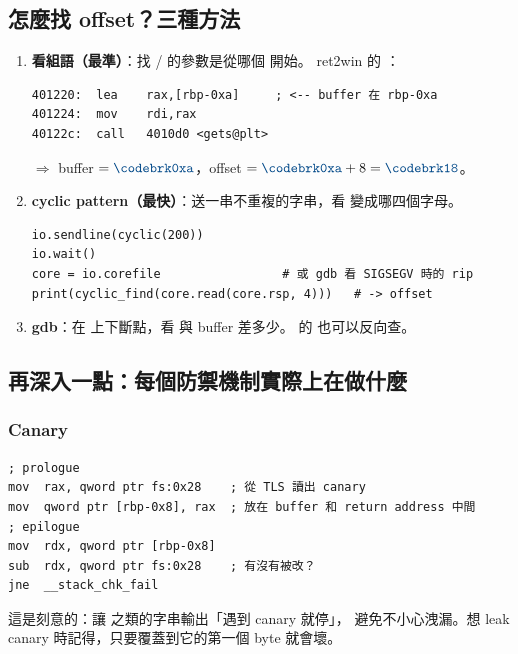 \subsection{怎麼找 offset？三種方法}

\begin{enumerate}[leftmargin=1.5em,itemsep=3pt]
  \item \textbf{看組語（最準）}：找 / 的參數是從哪個  開始。
        ret2win 的 ：
\begin{lstlisting}[style=asm]
401220:  lea    rax,[rbp-0xa]     ; <-- buffer 在 rbp-0xa
401224:  mov    rdi,rax
40122c:  call   4010d0 <gets@plt>
\end{lstlisting}
        $\Rightarrow$ buffer $= \code{0xa}$，offset $= \code{0xa}+8=\code{18}$。

  \item \textbf{cyclic pattern（最快）}：送一串不重複的字串，看  變成哪四個字母。
\begin{lstlisting}[style=py]
io.sendline(cyclic(200))
io.wait()
core = io.corefile                 # 或 gdb 看 SIGSEGV 時的 rip
print(cyclic_find(core.read(core.rsp, 4)))   # -> offset
\end{lstlisting}

  \item \textbf{gdb}：在  上下斷點，看  與 buffer 差多少。
         的  也可以反向查。
\end{enumerate}

\subsection{再深入一點：每個防禦機制實際上在做什麼}

\subsubsection{Canary}

\begin{lstlisting}[style=asm]
; prologue
mov  rax, qword ptr fs:0x28    ; 從 TLS 讀出 canary
mov  qword ptr [rbp-0x8], rax  ; 放在 buffer 和 return address 中間
; epilogue
mov  rdx, qword ptr [rbp-0x8]
sub  rdx, qword ptr fs:0x28    ; 有沒有被改？
jne  __stack_chk_fail
\end{lstlisting}

\begin{warnbox}
這是刻意的：讓  之類的字串輸出「遇到 canary 就停」，
避免不小心洩漏。想 leak canary 時記得，只要覆蓋到它的第一個 byte 就會壞。
\end{warnbox}

